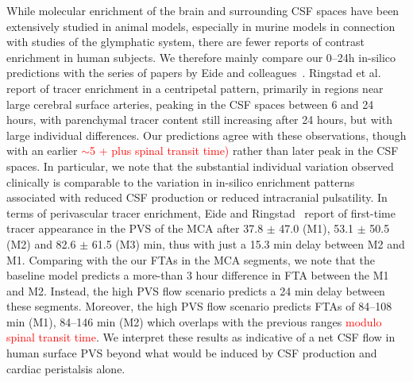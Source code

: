 \documentclass[fleqn,10pt]{wlscirep}
\newcommand{\discuss}[1]{\textcolor{red}{#1}}
\begin{document}

While molecular enrichment of the brain and surrounding CSF spaces
have been extensively studied in animal models, especially in murine
models in connection with studies of the glymphatic system, there are
fewer reports of contrast enrichment in human subjects. We therefore
mainly compare our 0--24h in-silico predictions with the series of
papers by Eide and colleagues~\cite{ringstad2017glymphatic,
  ringstad2018brain, eide2021sleep, eide2024functional}. Ringstad et
al.~\cite{ringstad2018brain} report of tracer enrichment in a
centripetal pattern, primarily in regions near large cerebral surface
arteries, peaking in the CSF spaces between 6 and 24 hours, with
parenchymal tracer content still increasing after 24 hours, but with
large individual differences. Our predictions agree with these
observations, though with an earlier \discuss{$\sim$5 + plus spinal
  transit time)} rather than later peak in the CSF spaces. In
particular, we note that the substantial individual variation observed
clinically is comparable to the variation in in-silico enrichment
patterns associated with reduced CSF production or reduced
intracranial pulsatility. In terms of perivascular tracer enrichment,
Eide and Ringstad~\cite{eide2024functional} report of first-time
tracer appearance in the PVS of the MCA after 37.8 $\pm$ 47.0 (M1),
53.1 $\pm$ 50.5 (M2) and 82.6 $\pm$ 61.5 (M3) min, thus with just a
15.3 min delay between M2 and M1. Comparing with the our FTAs in the
MCA segments, we note that the baseline model predicts a more-than 3
hour difference in FTA between the M1 and M2. Instead, the high PVS
flow scenario predicts a 24 min delay between these
segments. Moreover, the high PVS flow scenario predicts FTAs of
84--108 min (M1), 84--146 min (M2) which overlaps with the previous
ranges \discuss{modulo spinal transit time}. We interpret these
results as indicative of a net CSF flow in human surface PVS beyond
what would be induced by CSF production and cardiac peristalsis alone.
\end{document}
